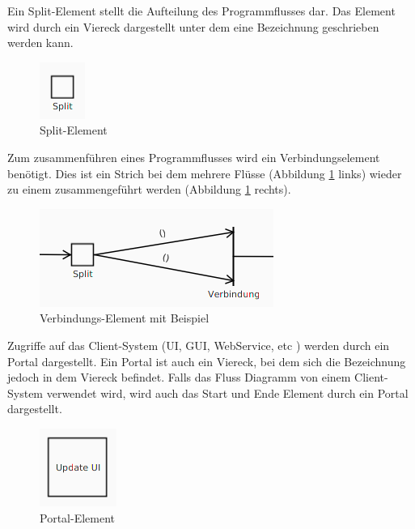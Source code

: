 Ein Split-Element stellt die Aufteilung des Programmflusses dar. Das Element wird durch ein Viereck dargestellt
unter dem eine Bezeichnung geschrieben werden kann.
\begin{figure}[H]
	\centering
	\includegraphics[width=\maxwidth{.9\textwidth}]{Element_Split.png}
	\caption{Split-Element}
\end{figure}

Zum zusammenführen eines Programmflusses wird ein Verbindungselement benötigt. Dies ist ein Strich bei dem
mehrere Flüsse (Abbildung \ref{flowElementVerbindung} links) wieder zu einem zusammengeführt werden (Abbildung
\ref{flowElementVerbindung} rechts).
\begin{figure}[H]
	\centering
	\includegraphics[width=\maxwidth{.9\textwidth}]{Element_Split_Verbindung.png}
	\caption{Verbindungs-Element mit Beispiel}
	\label{flowElementVerbindung}
\end{figure}

Zugriffe auf das Client-System (UI, GUI, WebService, etc \cite{flowDesign}) werden durch ein Portal dargestellt.
Ein Portal ist auch ein Viereck, bei dem sich die Bezeichnung jedoch in dem Viereck befindet. Falls das Fluss Diagramm
von einem Client-System verwendet wird, wird auch das Start und Ende Element durch ein Portal dargestellt.
\begin{figure}[H]
	\centering
	\includegraphics[width=\maxwidth{.9\textwidth}]{Element_Portal.png}
	\caption{Portal-Element}
\end{figure}

